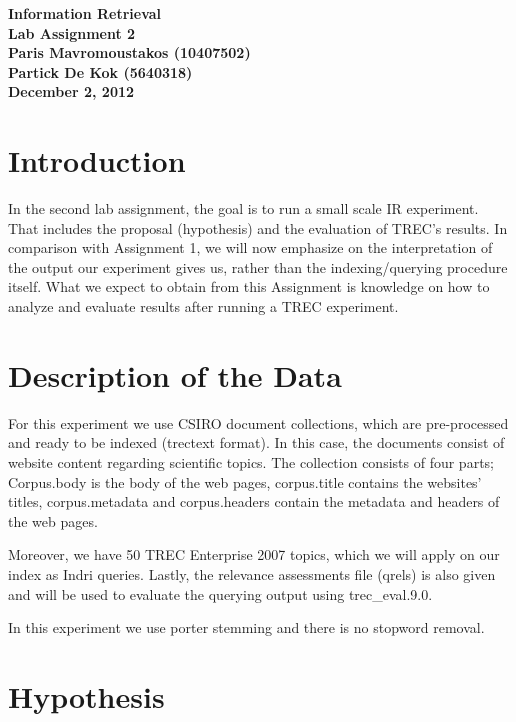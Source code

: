 \documentclass[letterpaper,11pt]{article}
\begin{document}
\begin{center}
\Huge \textbf{Information Retrieval}\\ \vspace{0.4cm}
\huge \textbf{Lab Assignment 2}\\ \vspace{0.4cm}
\LARGE \textbf{Paris Mavromoustakos (10407502)}\\
\LARGE \textbf{Partick De Kok (5640318)}\\ \vspace{0.4cm}
\textbf{ December 2, 2012}
\end{center}


\section{Introduction}
In the second lab assignment, the goal is to run a small scale IR experiment. That includes the proposal (hypothesis) and the evaluation of TREC's results. In comparison with Assignment 1, we will now emphasize on the interpretation of the output our experiment gives us, rather than the indexing/querying procedure itself. What we expect to obtain from this Assignment is knowledge on how to analyze and evaluate results after running a TREC experiment.


\section{Description of the Data }

For this experiment we use CSIRO document collections, which are pre-processed and ready to be indexed (trectext format). In this case, the documents consist of website content regarding scientific topics. The collection consists of four parts; Corpus.body is the body of the web pages, corpus.title contains the websites' titles, corpus.metadata and corpus.headers contain the metadata and headers of the web pages. 

Moreover, we have 50 TREC Enterprise 2007 topics, which we will apply on our index as Indri queries. Lastly, the relevance assessments file (qrels) is also given and will be used to evaluate the querying output using trec\_eval.9.0.

In this experiment we use porter stemming and there is no stopword removal.



\section{Hypothesis}
\end{document}
